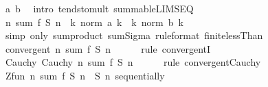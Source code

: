 \begin{isabellebody}
\ a\ b\ \isamarkupfalse%
\ {\isacharparenleft}{\kern0pt}intro\ tendsto{\isacharunderscore}{\kern0pt}mult\ summable{\isacharunderscore}{\kern0pt}LIMSEQ{\isacharparenright}{\kern0pt}\isanewline
\ \ \isamarkupfalse%
\ \isamarkupfalse%
\ {\isachardoublequoteopen}{\isacharparenleft}{\kern0pt}{\isasymlambda}n{\isachardot}{\kern0pt}\ sum\ {\isacharquery}{\kern0pt}f\ {\isacharparenleft}{\kern0pt}{\isacharquery}{\kern0pt}S{}\ n{\isacharparenright}{\kern0pt}{\isacharparenright}{\kern0pt}\ {\isasymlonglonglongrightarrow}\ {\isacharparenleft}{\kern0pt}{\isasymSum}k{\isachardot}{\kern0pt}\ norm\ {\isacharparenleft}{\kern0pt}a\ k{\isacharparenright}{\kern0pt}{\isacharparenright}{\kern0pt}\ {\isacharasterisk}{\kern0pt}\ {\isacharparenleft}{\kern0pt}{\isasymSum}k{\isachardot}{\kern0pt}\ norm\ {\isacharparenleft}{\kern0pt}b\ k{\isacharparenright}{\kern0pt}{\isacharparenright}{\kern0pt}{\isachardoublequoteclose}\isanewline
\ \ \ \ \isamarkupfalse%
\ {\isacharparenleft}{\kern0pt}simp\ only{\isacharcolon}{\kern0pt}\ sum{\isacharunderscore}{\kern0pt}product\ sum{\isachardot}{\kern0pt}Sigma\ {\isacharbrackleft}{\kern0pt}rule{\isacharunderscore}{\kern0pt}format{\isacharbrackright}{\kern0pt}\ finite{\isacharunderscore}{\kern0pt}lessThan{\isacharparenright}{\kern0pt}\isanewline
\ \ \isamarkupfalse%
\ \isamarkupfalse%
\ {\isachardoublequoteopen}convergent\ {\isacharparenleft}{\kern0pt}{\isasymlambda}n{\isachardot}{\kern0pt}\ sum\ {\isacharquery}{\kern0pt}f\ {\isacharparenleft}{\kern0pt}{\isacharquery}{\kern0pt}S{}\ n{\isacharparenright}{\kern0pt}{\isacharparenright}{\kern0pt}{\isachardoublequoteclose}\isanewline
\ \ \ \ \isamarkupfalse%
\ {\isacharparenleft}{\kern0pt}rule\ convergentI{\isacharparenright}{\kern0pt}\isanewline
\ \ \isamarkupfalse%
\ \isamarkupfalse%
\ Cauchy{\isacharcolon}{\kern0pt}\ {\isachardoublequoteopen}Cauchy\ {\isacharparenleft}{\kern0pt}{\isasymlambda}n{\isachardot}{\kern0pt}\ sum\ {\isacharquery}{\kern0pt}f\ {\isacharparenleft}{\kern0pt}{\isacharquery}{\kern0pt}S{}\ n{\isacharparenright}{\kern0pt}{\isacharparenright}{\kern0pt}{\isachardoublequoteclose}\isanewline
\ \ \ \ \isamarkupfalse%
\ {\isacharparenleft}{\kern0pt}rule\ convergent{\isacharunderscore}{\kern0pt}Cauchy{\isacharparenright}{\kern0pt}\isanewline
\ \ \isamarkupfalse%
\ {\isachardoublequoteopen}Zfun\ {\isacharparenleft}{\kern0pt}{\isasymlambda}n{\isachardot}{\kern0pt}\ sum\ {\isacharquery}{\kern0pt}f\ {\isacharparenleft}{\kern0pt}{\isacharquery}{\kern0pt}S{}\ n\ {\isacharminus}{\kern0pt}\ {\isacharquery}{\kern0pt}S{}\ n{\isacharparenright}{\kern0pt}{\isacharparenright}{\kern0pt}\ sequentially{\isachardoublequoteclose}\isanewline

\end{isabellebody}
